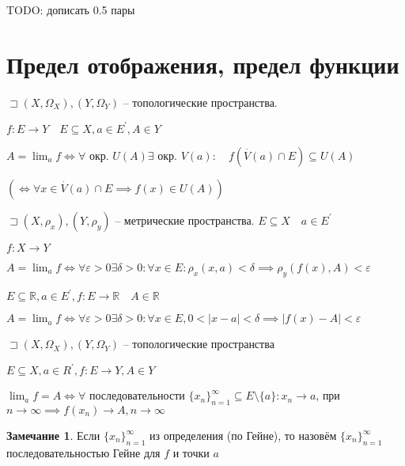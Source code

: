 \documentclass{book}
\newcommand\R{\ensuremath{\mathbb{R}}}
\newcommand{\p}[1]{#1^{\prime}}
\theoremstyle{definition}
\newtheorem*{note}{Замечание}
\begin{document}
 

TODO: дописать 0.5 пары

\section{Предел отображения, предел функции}

\begin{definition}
    $\sqsupset (X, \Omega_X), (Y, \Omega_Y)$ -- топологические пространства.

    $f:E\to Y\quad E\subseteq X, a\in \p E, A\in Y$

    $A = \lim_a f \iff \forall $ окр. $U(A) \exists $ окр. $V(a):\quad f\left( \overset{\cdot }V(a)\cap E \right) \subseteq U(A)$

    $\left( \iff  \forall x\in \overset{\cdot }V(a)\cap E \implies f(x)\in U(A) \right) $
\end{definition}

\begin{definition}
    [по Коши]

    $\sqsupset  (X, \rho_x), (Y, \rho_y)$ -- метрические пространства. $E\subseteq X\quad a\in \p E$

    $f:X\to Y$

    $A = \lim_a f \iff \forall \varepsilon>0\exists \delta >0:\forall x\in E: \rho_x(x, a)<\delta \implies \rho_y(f(x), A)<\varepsilon$
\end{definition}
\begin{definition}

    $E\subseteq \R, a\in \p E, f:E\to \R\quad A\in \R$

    $A = \lim_af \iff \forall \varepsilon>0\exists \delta >0: \forall x\in E, 0<|x-a|<\delta \implies \left| f(x)-A \right| <\varepsilon$
\end{definition}

\begin{definition}
    [по Гейне]
    $\sqsupset (X, \Omega_X), (Y, \Omega_Y)$ -- топологические пространства

    $E\subseteq X, a\in \p R, f:E\to Y, A\in Y$

    $\lim_a f=A\iff \forall $ последовательности $\{x_{n} \}_{n=1}^{\infty }\subseteq E\setminus \{a\}: x_{n} \to a$, при $n\to \infty  \implies  f(x_n) \to A, n\to \infty $
\end{definition}

\begin{note}
    Если $\{x_{n}\}_{n=1}^{\infty }$ из определения (по Гейне), то назовём $\{x_{n} \}_{n=1}^{\infty }$ последовательностью Гейне для $f$ и точки  $a$
\end{note}
\end{document}
